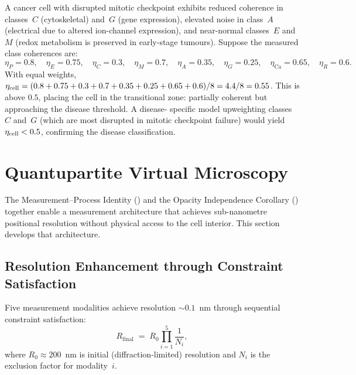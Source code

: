 \begin{example}
A cancer cell with disrupted mitotic checkpoint exhibits reduced coherence in
classes~$C$ (cytoskeletal) and~$G$ (gene expression), elevated noise in
class~$A$ (electrical due to altered ion-channel expression), and near-normal
classes~$E$ and~$M$ (redox metabolism is preserved in early-stage tumours).
Suppose the measured class coherences are:
\[
    \eta_P = 0.8,\quad
    \eta_E = 0.75,\quad
    \eta_C = 0.3,\quad
    \eta_M = 0.7,\quad
    \eta_A = 0.35,\quad
    \eta_G = 0.25,\quad
    \eta_\mathrm{Ca} = 0.65,\quad
    \eta_R = 0.6.
\]
With equal weights, $\eta_{\mathrm{cell}} = (0.8+0.75+0.3+0.7+0.35+0.25+0.65+0.6)/8 =
4.4/8 = 0.55$.  This is above $0.5$, placing the cell in the transitional
zone: partially coherent but approaching the disease threshold.  A disease-
specific model upweighting classes~$C$ and~$G$ (which are most disrupted in
mitotic checkpoint failure) would yield $\eta_{\mathrm{cell}} < 0.5$, confirming the
disease classification.
\end{example}

\section{Quantupartite Virtual Microscopy}
\label{sec:virtual-microscopy}

The Measurement--Process Identity () and the Opacity Independence
Corollary () together enable a measurement architecture
that achieves sub-nanometre positional resolution without physical access to the
cell interior.  This section develops that architecture.

\subsection{Resolution Enhancement through Constraint Satisfaction}

\begin{theorem}
\label{thm:seq-exclusion}
Five measurement modalities achieve resolution $\sim 0.1$~nm through sequential
constraint satisfaction:
\begin{equation}
    R_\mathrm{final} \;=\; R_0 \prod_{i=1}^{5} \frac{1}{N_i},
\end{equation}
where $R_0 \approx 200$~nm is initial (diffraction-limited) resolution and
$N_i$ is the exclusion factor for modality~$i$.
\end{theorem}

